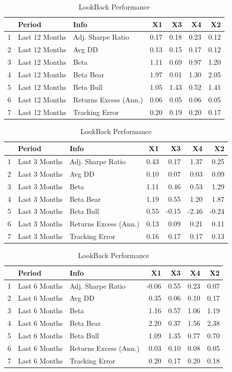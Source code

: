 \documentclass[11pt,preprint, authoryear]{elsarticle}
\numberwithin{equation}{section}
\numberwithin{figure}{section}
\numberwithin{table}{section}
\begin{document}
\begin{longtable}{rllrrrr}
\caption{LookBack Performance \label{tab3}} \\ 
  \hline
 & Period & Info & X1 & X3 & X4 & X2 \\ 
  \hline
1 & Last 12 Months & Adj. Sharpe Ratio & 0.17 & 0.18 & 0.23 & 0.12 \\ 
  2 & Last 12 Months & Avg DD & 0.13 & 0.15 & 0.17 & 0.12 \\ 
  3 & Last 12 Months & Beta & 1.11 & 0.69 & 0.97 & 1.20 \\ 
  4 & Last 12 Months & Beta Bear & 1.97 & 0.01 & 1.30 & 2.05 \\ 
  5 & Last 12 Months & Beta Bull & 1.05 & 1.43 & 0.52 & 1.41 \\ 
  6 & Last 12 Months & Returns Excess (Ann.) & 0.06 & 0.05 & 0.06 & 0.05 \\ 
  7 & Last 12 Months & Tracking Error & 0.20 & 0.19 & 0.20 & 0.17 \\ 
   \hline
\hline
\end{longtable}

\begin{longtable}{rllrrrr}
\caption{LookBack Performance \label{tab4}} \\ 
  \hline
 & Period & Info & X1 & X3 & X4 & X2 \\ 
  \hline
1 & Last 3 Months & Adj. Sharpe Ratio & 0.43 & 0.17 & 1.37 & 0.25 \\ 
  2 & Last 3 Months & Avg DD & 0.10 & 0.07 & 0.03 & 0.09 \\ 
  3 & Last 3 Months & Beta & 1.11 & 0.46 & 0.53 & 1.29 \\ 
  4 & Last 3 Months & Beta Bear & 1.19 & 0.55 & 1.20 & 1.87 \\ 
  5 & Last 3 Months & Beta Bull & 0.55 & -0.15 & -2.46 & -0.24 \\ 
  6 & Last 3 Months & Returns Excess (Ann.) & 0.13 & 0.09 & 0.21 & 0.11 \\ 
  7 & Last 3 Months & Tracking Error & 0.16 & 0.17 & 0.17 & 0.13 \\ 
   \hline
\hline
\end{longtable}

\begin{longtable}{rllrrrr}
\caption{LookBack Performance \label{tab5}} \\ 
  \hline
 & Period & Info & X1 & X3 & X4 & X2 \\ 
  \hline
1 & Last 6 Months & Adj. Sharpe Ratio & -0.06 & 0.55 & 0.23 & 0.07 \\ 
  2 & Last 6 Months & Avg DD & 0.35 & 0.06 & 0.10 & 0.17 \\ 
  3 & Last 6 Months & Beta & 1.16 & 0.57 & 1.06 & 1.19 \\ 
  4 & Last 6 Months & Beta Bear & 2.20 & 0.37 & 1.56 & 2.38 \\ 
  5 & Last 6 Months & Beta Bull & 1.09 & 1.35 & 0.77 & 0.70 \\ 
  6 & Last 6 Months & Returns Excess (Ann.) & 0.03 & 0.10 & 0.08 & 0.05 \\ 
  7 & Last 6 Months & Tracking Error & 0.20 & 0.17 & 0.20 & 0.18 \\ 
   \hline
\hline
\end{longtable}
\newpage
\end{document}
